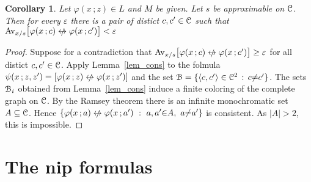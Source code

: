 \documentclass[10pt,openany]{article}
\newcommand{\sbar}[1]{\mkern 3mu\overline{\mkern-3mu#1\mkern-1mu}\mkern 1mu}
\def\niff{\mathrel{{\leftrightarrow}\llap{\raisebox{-.1ex}{{\small$/$}}\hskip.5ex}}}
\def\C{\EuScript C}
\def\U{\EuScript U}
\def\B{\EuScript B}
\def\<{\langle}
\def\>{\rangle}
\def\phi{\varphi}
\def\epsilon{\varepsilon}
\newcounter{thm}[section]
\theoremstyle{mio}
\newtheorem{corollary}[thm]{Corollary}
\newtheorem{definition}[thm]{Definition}
\theoremstyle{liscio}
\def\QED{\noindent\nolinebreak[4]\hspace{\stretch{1}}\rlap{\ \ $\Box$}\medskip}
\renewcommand*{\emph}[1]{%
   \kern-0.2ex 
   \smash{\tikz[baseline]
   \node[ rectangle, fill=emphcolor, rounded corners, 
          inner xsep=.3ex, inner ysep=.2ex, anchor=base,
          minimum height = 3ex
         ]{#1};
   }
   \kern-1.2ex 
}
\begin{document}
\begin{corollary}
  Let $\phi(x\,;z)\in L$ and $M$ be given.
  Let $s$ be approximable on $\C$.
  Then for every $\epsilon$ there is a pair of distict $c,c'\in\C$ such that $\Av_{x/s}\big[\phi(x\,;c)\niff\phi(x\,;c')\big]<\epsilon$
\end{corollary}

\begin{proof}
  Suppose for a contradiction that $\Av_{x/s}\big[\phi(x\,;c)\niff\phi(x\,;c')\big]\ge\epsilon$ for all distict $c,c'\in\C$. Apply Lemma~\ref{lem_cons} to the folmula $\psi(x\,;z,z') = [\phi(x\,;z)\niff\phi(x\,;z')]$ and the set $\B=\{\<c,c'\>\in\C^2\, :\, c{\neq} c'\}$.
  The sets $\B_i$ obtained from Lemma~\ref{lem_cons} induce a finite coloring of the complete graph on $\C$.
  By the Ramsey theorem there is an infinite monochromatic set $A\subseteq\C$.
  Hence $\{\phi(x\,;a)\niff\phi(x\,;a')\  :\  a,a'{\in} A,\ a{\neq} a'\}$ is consistent.
  As $|A|>2$, this is impossible.
\end{proof}








\section{The nip formulas}\label{nip}
\end{document}
